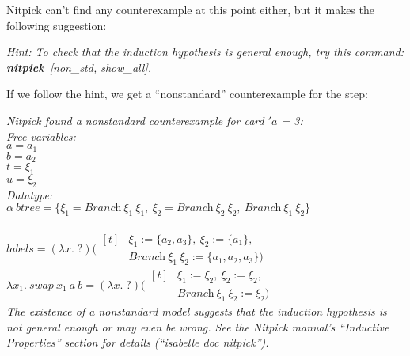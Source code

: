 \documentclass[a4paper,12pt]{article}
\def\unk{{?}}
\def\undef{(\lambda x.\; \unk)}
\begin{document}
Nitpick can't find any counterexample at this point either, but it makes the
following suggestion:

\prew
\slshape
Hint: To check that the induction hypothesis is general enough, try this command:
\textbf{nitpick}~[\textit{non\_std}, \textit{show\_all}].
\postw

If we follow the hint, we get a ``nonstandard'' counterexample for the step:

\prew
\slshape Nitpick found a nonstandard counterexample for \textit{card} $'a$ = 3: \\[2\smallskipamount]
\hbox{}\qquad Free variables: \nopagebreak \\
\hbox{}\qquad\qquad $a = a_1$ \\
\hbox{}\qquad\qquad $b = a_2$ \\
\hbox{}\qquad\qquad $t = \xi_1$ \\
\hbox{}\qquad\qquad $u = \xi_2$ \\
\hbox{}\qquad Datatype: \nopagebreak \\
\hbox{}\qquad\qquad $\alpha~\textit{btree} = \{\xi_1 \mathbin{=} \textit{Branch}~\xi_1~\xi_1,\> \xi_2 \mathbin{=} \textit{Branch}~\xi_2~\xi_2,\> \textit{Branch}~\xi_1~\xi_2\}$ \\
\hbox{} \nopagebreak \\
\hbox{}\qquad\qquad $\textit{labels} = \undef
    (\!\begin{aligned}[t]%
    & \xi_1 := \{a_2, a_3\},\> \xi_2 := \{a_1\},\> \\[-2pt]
    & \textit{Branch}~\xi_1~\xi_2 := \{a_1, a_2, a_3\})\end{aligned}$ \\
\hbox{}\qquad\qquad $\lambda x_1.\> \textit{swap}~x_1~a~b = \undef
    (\!\begin{aligned}[t]%
    & \xi_1 := \xi_2,\> \xi_2 := \xi_2, \\[-2pt]
    & \textit{Branch}~\xi_1~\xi_2 := \xi_2)\end{aligned}$ \\[2\smallskipamount]
The existence of a nonstandard model suggests that the induction hypothesis is not general enough or may even
be wrong. See the Nitpick manual's ``Inductive Properties'' section for details (``\textit{isabelle doc nitpick}'').
\postw
\end{document}
